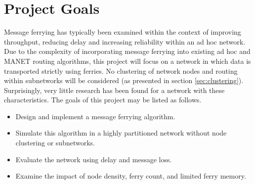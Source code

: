 
\section{Project Goals}

Message ferrying has typically been examined within the context of improving throughput, reducing delay and increasing reliability within an ad hoc network.
Due to the complexity of incorporating message ferrying into existing ad hoc and MANET routing algorithms, this project will focus on a network in which data is transported strictly using ferries.
No clustering of network nodes and routing within subnetworks will be considered (as presented in section \ref{sec:clustering}).
Surprisingly, very little research has been found for a network with these characteristics.
The goals of this project may be listed as follows.

\begin{itemize}
\item Design and implement a message ferrying algorithm.
\item Simulate this algorithm in a highly partitioned network without node clustering or subnetworks.
\item Evaluate the network using delay and message loss.
\item Examine the impact of node density, ferry count, and limited ferry memory.
\end{itemize}


%
%

